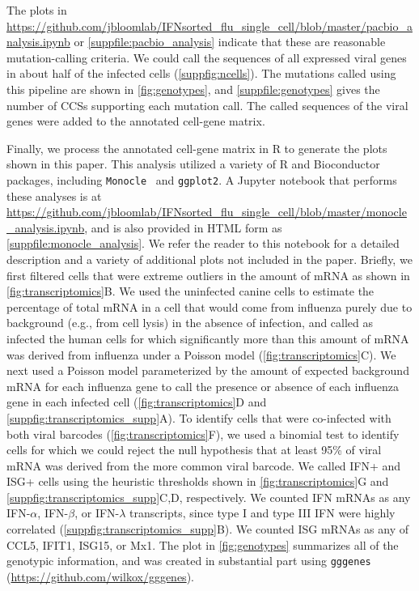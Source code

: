 \documentclass[10pt,letterpaper]{article}
\newcommand{\FIG}[1]{\autoref{fig:#1}}
\newcommand{\SUPPFILE}[1]{\autoref{suppfile:#1}}
\newcommand{\SUPPFIG}[1]{\autoref{suppfig:#1}}
\begin{document}
The plots in \url{https://github.com/jbloomlab/IFNsorted_flu_single_cell/blob/master/pacbio_analysis.ipynb} or \SUPPFILE{pacbio_analysis} indicate that these are reasonable mutation-calling criteria.
We could call the sequences of all expressed viral genes in about half of the infected cells (\SUPPFIG{ncells}).
The mutations called using this pipeline are shown in \FIG{genotypes}, and \SUPPFILE{genotypes} gives the number of CCSs supporting each mutation call.
The called sequences of the viral genes were added to the annotated cell-gene matrix.

Finally, we process the annotated cell-gene matrix in R to generate the plots shown in this paper.
This analysis utilized a variety of R and Bioconductor~\citep{huber2015orchestrating} packages, including \texttt{Monocle}~\citep{qiu2017reversed, trapnell2014dynamics} and \texttt{ggplot2}.
A Jupyter notebook that performs these analyses is at \url{https://github.com/jbloomlab/IFNsorted_flu_single_cell/blob/master/monocle_analysis.ipynb}, and is also provided in HTML form as \SUPPFILE{monocle_analysis}.
We refer the reader to this notebook for a detailed description and a variety of additional plots not included in the paper.
Briefly, we first filtered cells that were extreme outliers in the amount of mRNA as shown in \FIG{transcriptomics}B.
We used the uninfected canine cells to estimate the percentage of total mRNA in a cell that would come from influenza purely due to background (e.g., from cell lysis) in the absence of infection, and called as infected the human cells for which significantly more than this amount of mRNA was derived from influenza under a Poisson model (\FIG{transcriptomics}C).
We next used a Poisson model parameterized by the amount of expected background mRNA for each influenza gene to call the presence or absence of each influenza gene in each infected cell (\FIG{transcriptomics}D and \SUPPFIG{transcriptomics_supp}A). 
To identify cells that were co-infected with both viral barcodes (\FIG{transcriptomics}F), we used a binomial test to identify cells for which we could reject the null hypothesis that at least 95\% of viral mRNA was derived from the more common viral barcode.
We called IFN+ and ISG+ cells using the heuristic thresholds shown in \FIG{transcriptomics}G and \SUPPFIG{transcriptomics_supp}C,D, respectively.
We counted IFN mRNAs as any IFN-$\alpha$, IFN-$\beta$, or IFN-$\lambda$ transcripts, since type I and type III IFN were highly correlated (\SUPPFIG{transcriptomics_supp}B).
We counted ISG mRNAs as any of CCL5, IFIT1, ISG15, or Mx1.
The plot in \FIG{genotypes} summarizes all of the genotypic information, and was created in substantial part using \texttt{gggenes} (\url{https://github.com/wilkox/gggenes}).
\end{document}
